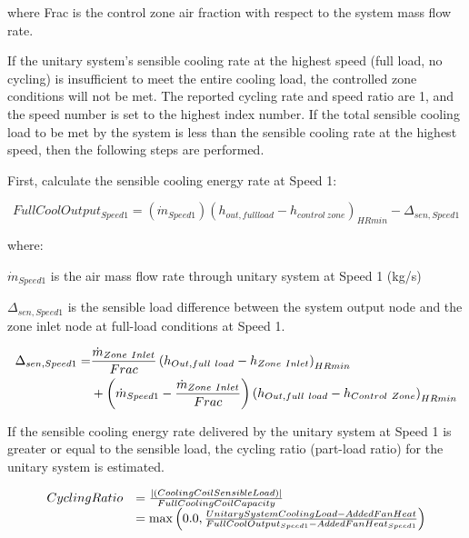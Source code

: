 where Frac is the control zone air fraction with respect to the system mass flow rate.

If the unitary system's sensible cooling rate at the highest speed (full load, no cycling) is insufficient to meet the entire cooling load, the controlled zone conditions will not be met. The reported cycling rate and speed ratio are 1, and the speed number is set to the highest index number. If the total sensible cooling load to be met by the system is less than the sensible cooling rate at the highest speed, then the following steps are performed.

First, calculate the sensible cooling energy rate at Speed 1:

\begin{equation}
FullCoolOutpu{t_{Speed1}} = ({\dot m_{Speed1}}){({h_{out,fullload}} - {h_{control~zone}})_{HRmin}} - {\Delta_{sen,Speed1}}
\end{equation}

where:

\emph{\({\dot m_{Speed1}}\)} is the air mass flow rate through unitary system at Speed 1 (kg/s)

\(\Delta_{sen,Speed1}\) is the sensible load difference between the system output node and the zone inlet node at full-load conditions at Speed 1.

\begin{equation}
  \begin{split}
    \Delta_{sen,Speed1} =& \frac{\dot{m}_{Zone~Inlet}}{Frac} \left(h_{Out,full~load} - h_{Zone~Inlet}\right)_{HRmin} \\
                              &+ \left(\dot{m}_{Speed1} - \frac{\dot{m}_{Zone~Inlet}}{Frac}\right) \left(h_{Out,full~load} - h_{Control~Zone}\right)_{HRmin}
  \end{split}
\end{equation}

If the sensible cooling energy rate delivered by the unitary system at Speed 1 is greater or equal to the sensible load, the cycling ratio (part-load ratio) for the unitary system is estimated.

\begin{equation}
  \begin{array}{rl}
    CyclingRatio &= \frac{ \left| \left(CoolingCoilSensibleLoad\right) \right| } {FullCoolingCoilCapacity} \\
                 &= \max \left(0.0,\frac{UnitarySystemCoolingLoad - AddedFanHeat}{FullCoolOutput_{Speed1} - AddedFanHeat_{Speed1}}\right)
  \end{array}
\end{equation}

